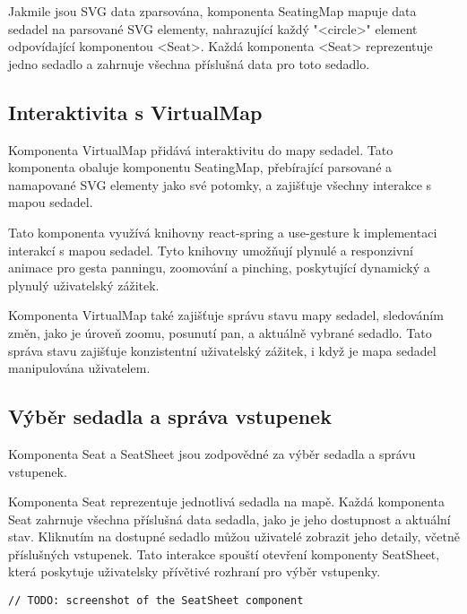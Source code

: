 Jakmile jsou SVG data zparsována, komponenta SeatingMap mapuje data sedadel na parsované SVG elementy, nahrazující každý "<circle>" element odpovídající komponentou <Seat>.
Každá komponenta <Seat> reprezentuje jedno sedadlo a zahrnuje všechna příslušná data pro toto sedadlo.

\subsection{Interaktivita s VirtualMap}
\label{subsec:implementace-seating-virtualmap}
Komponenta VirtualMap přidává interaktivitu do mapy sedadel.
Tato komponenta obaluje komponentu SeatingMap, přebírající parsované a namapované SVG elementy jako své potomky, a zajišťuje všechny interakce s mapou sedadel.


Tato komponenta využívá knihovny react-spring a use-gesture k implementaci interakcí s mapou sedadel.
Tyto knihovny umožňují plynulé a responzivní animace pro gesta panningu, zoomování a pinching, poskytující dynamický a plynulý uživatelský zážitek.

Komponenta VirtualMap také zajišťuje správu stavu mapy sedadel, sledováním změn, jako je úroveň zoomu, posunutí pan, a aktuálně vybrané sedadlo.
Tato správa stavu zajišťuje konzistentní uživatelský zážitek, i když je mapa sedadel manipulována uživatelem.

\subsection{Výběr sedadla a správa vstupenek}
\label{subsec:implementace-seating-seat}
Komponenta Seat a SeatSheet jsou zodpovědné za výběr sedadla a správu vstupenek.

Komponenta Seat reprezentuje jednotlivá sedadla na mapě.
Každá komponenta Seat zahrnuje všechna příslušná data sedadla, jako je jeho dostupnost a aktuální stav.
Kliknutím na dostupné sedadlo můžou uživatelé zobrazit jeho detaily, včetně příslušných vstupenek.
Tato interakce spouští otevření komponenty SeatSheet, která poskytuje uživatelsky přívětivé rozhraní pro výběr vstupenky.

\begin{verbatim}
// TODO: screenshot of the SeatSheet component
\end{verbatim}

